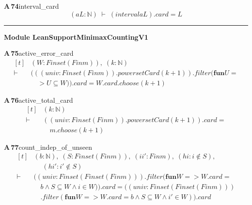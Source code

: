 \documentclass[conference]{IEEEtran}
\theoremstyle{definition}
\newcommand{\lean}[1]{\textsf{\footnotesize #1}}
\begin{document}
\noindent\textbf{A\,74}\quad\lean{interval\_card}
{\footnotesize\[ (\mathit{a} \mathit{L} : \mathbb{N} ) \;\vdash\; (\mathit{interval} \mathit{a} \mathit{L}).\mathit{card}=\mathit{L} \]}

\vspace{4pt}\noindent\rule{\columnwidth}{0.4pt}\par\vspace{2pt}
\noindent\textbf{Module \lean{LeanSupportMinimaxCountingV1}}\par\vspace{3pt}

\noindent\textbf{A\,75}\quad\lean{active\_error\_card}
{\footnotesize\[ \begin{aligned}[t]
&(\mathit{W} : \mathit{Finset} (\mathit{Fin} \mathit{m})),\; (\mathit{k} : \mathbb{N} )\\
\vdash\;&(((\mathit{univ} : \mathit{Finset} (\mathit{Fin} \mathit{m})).\mathit{powersetCard} (\mathit{k}+1)).\mathit{filter} (\mathbf{fun} \mathit{U} =\\
&\quad > \mathit{U} \subseteq \mathit{W})).\mathit{card} = \mathit{W}.\mathit{card}.\mathit{choose} (\mathit{k}+1)
\end{aligned} \]}

\noindent\textbf{A\,76}\quad\lean{active\_total\_card}
{\footnotesize\[ \begin{aligned}[t]
&(\mathit{k} : \mathbb{N} )\\
\vdash\;&((\mathit{univ} : \mathit{Finset} (\mathit{Fin} \mathit{m})).\mathit{powersetCard} (\mathit{k}+1)).\mathit{card} =\\
&\quad \mathit{m}.\mathit{choose} (\mathit{k}+1)
\end{aligned} \]}

\noindent\textbf{A\,77}\quad\lean{count\_indep\_of\_unseen}
{\footnotesize\[ \begin{aligned}[t]
&(\mathit{b} : \mathbb{N} ),\; (\mathit{S} : \mathit{Finset} (\mathit{Fin} \mathit{m})),\; (\mathit{i} \mathit{i'} : \mathit{Fin} \mathit{m}),\; (\mathit{hi} : \mathit{i} \notin \mathit{S}),\\
&\quad \; (\mathit{hi'} : \mathit{i'} \notin \mathit{S})\\
\vdash\;&((\mathit{univ} : \mathit{Finset} (\mathit{Finset} (\mathit{Fin} \mathit{m}))).\mathit{filter} (\mathbf{fun} \mathit{W} => \mathit{W}.\mathit{card} =\\
&\quad \mathit{b} \wedge \mathit{S} \subseteq \mathit{W} \wedge \mathit{i} \in \mathit{W})).\mathit{card} = ((\mathit{univ} : \mathit{Finset} (\mathit{Finset} (\mathit{Fin} \mathit{m})))\\
&\quad .\mathit{filter} (\mathbf{fun} \mathit{W} => \mathit{W}.\mathit{card} = \mathit{b} \wedge \mathit{S} \subseteq \mathit{W} \wedge \mathit{i'} \in \mathit{W})).\mathit{card}
\end{aligned} \]}
\end{document}
